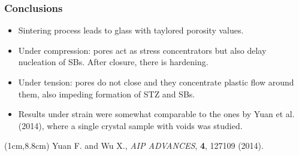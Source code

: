 

\begin{frame}
    \frametitle{Conclusions}
    \vspace{0.5cm}
    \begin{itemize}
        \item Sintering process leads to glass with taylored porosity values.
        \item Under compression: pores act as stress concentrators but also delay nucleation of SBs. After closure, there is hardening.
        \item Under tension: pores do not close and they concentrate plastic flow around them, also impeding formation of STZ and SBs.
        \item Results under strain were somewhat comparable to the ones by Yuan et al. (2014), where a single crystal sample with voids was studied.
    \end{itemize}
    \begin{textblock*}{12cm}(1cm,8.8cm) %
        \scriptsize{Yuan F. and Wu X., \textit{AIP ADVANCES}, \textbf{4}, 127109 (2014).}
    \end{textblock*}
\end{frame}


